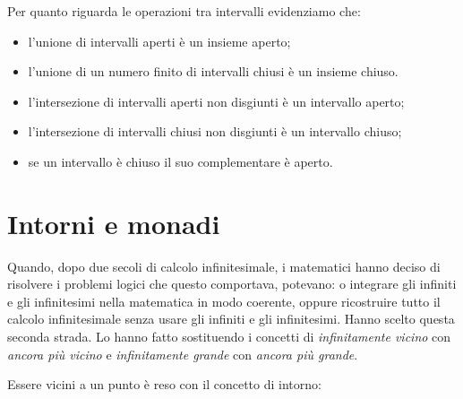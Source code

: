 Per quanto riguarda le operazioni tra intervalli evidenziamo che:
\begin{itemize} %
\item 
l'unione di intervalli aperti è un insieme aperto; 
\item 
l'unione di un numero finito di intervalli chiusi è un insieme chiuso. 
\item 
l'intersezione di intervalli aperti non disgiunti è un intervallo aperto;
\item 
l'intersezione di intervalli chiusi non disgiunti è un intervallo chiuso;
\item 
se un intervallo è chiuso il suo complementare è aperto.
\end{itemize}

\section{Intorni e monadi}
\label{sec:topologiaintorni}

Quando, dopo due secoli di calcolo infinitesimale, i matematici hanno deciso 
di risolvere i problemi logici che questo comportava, potevano: 
o integrare gli infiniti e gli infinitesimi nella matematica 
in modo coerente, oppure ricostruire tutto il calcolo infinitesimale senza 
usare gli infiniti e gli infinitesimi. 
Hanno scelto questa seconda strada.
Lo hanno fatto sostituendo i concetti di \emph{infinitamente vicino} con 
\emph{ancora più vicino} e \emph{infinitamente grande} con 
\emph{ancora più grande}. 

Essere vicini a un punto è reso con il concetto di intorno:

{}

